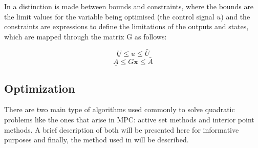 In \cite{Ferreau2011} a distinction is made between bounds and constraints, where the bounds are the limit values for the variable being optimised (the control signal $u$) and the constraints are expressions to define the limitations of the outputs and states, which are mapped through the matrix G as follows:

\begin{equation} \label{constraints1}
\underline{U} \leq u \leq \bar{U}
\end{equation}
\begin{equation} \label{constraints2}
\underline{A} \leq G\mathbf{x} \leq \bar{A} 
\end{equation}


\subsection{Optimization}%

There are two main type of algorithms used commonly to solve quadratic problems like the ones that arise in MPC: active set methods and interior point methods. A brief description of both will be presented here for informative purposes and finally, the method used in \cite{Ferreau2011} will be described.

